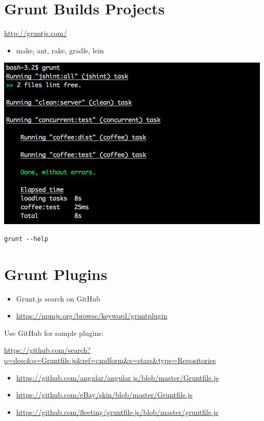\documentclass[11pt]{article}
\begin{document}
\section*{Grunt Builds Projects}
\label{sec-17}

\url{http://gruntjs.com/}

\begin{itemize}
\item make, ant, rake, gradle, lein
\end{itemize}

\includegraphics[width=.9\linewidth]{gdg_2013-11-18_yo_grunt_bower/eg-grunt.png}

\begin{verbatim}
grunt --help
\end{verbatim}
\section*{Grunt Plugins}
\label{sec-18}

\begin{itemize}
\item Grunt.js search on GitHub
\item \url{https://npmjs.org/browse/keyword/gruntplugin}
\end{itemize}

Use GitHub for sample plugins: 

\url{https://github.com/search?o=desc&q=Gruntfile.js&ref=cmdform&s=stars&type=Repositories}

\begin{itemize}
\item \url{https://github.com/angular/angular.js/blob/master/Gruntfile.js}
\item \url{https://github.com/eBay/skin/blob/master/Gruntfile.js}
\item \url{https://github.com/fleeting/gruntfile.js/blob/master/gruntfile.js}
\end{itemize}
\end{document}
